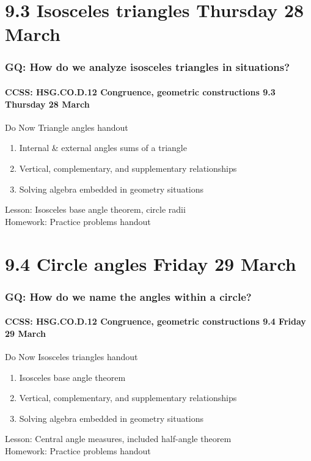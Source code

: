 \documentclass{beamer}
\begin{document}
\section{9.3 Isosceles triangles Thursday 28 March}
  \frame
  {
    \frametitle{GQ: How do we analyze isosceles triangles in situations?}
    \framesubtitle{CCSS: HSG.CO.D.12 Congruence, geometric constructions \hfill \alert{9.3 Thursday 28 March}}

      \begin{block}{Do Now Triangle angles handout}
        \begin{enumerate}
          \item Internal \& external angles sums of a triangle
          \item Vertical, complementary, and supplementary relationships
          \item Solving algebra embedded in geometry situations
        \end{enumerate}
      \end{block}
    Lesson: Isosceles base angle theorem, circle radii\\
    Homework: Practice problems handout
  }

\section{9.4 Circle angles Friday 29 March}
  \frame
  {
    \frametitle{GQ: How do we name the angles within a circle?}
    \framesubtitle{CCSS: HSG.CO.D.12 Congruence, geometric constructions \hfill \alert{9.4 Friday 29 March}}

      \begin{block}{Do Now Isosceles triangles handout}
        \begin{enumerate}
          \item Isosceles base angle theorem
          \item Vertical, complementary, and supplementary relationships
          \item Solving algebra embedded in geometry situations
        \end{enumerate}
      \end{block}
    Lesson: Central angle measures, included half-angle theorem\\
    Homework: Practice problems handout
  }
\end{document}
